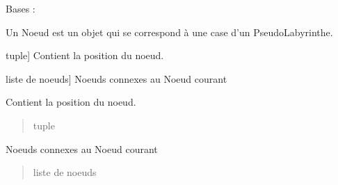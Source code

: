 \documentclass[letterpaper,10pt,french]{sphinxmanual}
\begin{document}
\begin{fulllineitems}
\label{\detokenize{src:src.utilites.Noeud}}
\pysigstartsignatures
{}
\pysigstopsignatures
\sphinxAtStartPar
Bases : 

\sphinxAtStartPar
Un Noeud est un objet qui se correspond à une case d’un PseudoLabyrinthe.
\begin{description}
\sphinxlineitem{id}{[}tuple{]}
\sphinxAtStartPar
Contient la position du noeud.

\sphinxlineitem{connexions}{[}liste de noeuds{]}
\sphinxAtStartPar
Noeuds connexes au Noeud courant

\end{description}

\begin{fulllineitems}
\label{\detokenize{src:src.utilites.Noeud.__id}}
\pysigstartsignatures
{}
\pysigstopsignatures
\sphinxAtStartPar
Contient la position du noeud.
\begin{quote}\begin{description}
\sphinxAtStartPar
tuple

\end{description}\end{quote}

\end{fulllineitems}


\begin{fulllineitems}
\label{\detokenize{src:src.utilites.Noeud.__connexions}}
\pysigstartsignatures
{}
\pysigstopsignatures
\sphinxAtStartPar
Noeuds connexes au Noeud courant
\begin{quote}\begin{description}
\sphinxAtStartPar
liste de noeuds

\end{description}\end{quote}


\end{fulllineitems}
\end{fulllineitems}
\end{document}
